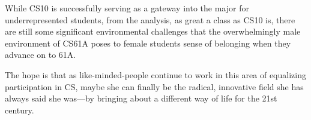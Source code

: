 \documentclass[twoside,openright,titlepage,numbers=noenddot,headinclude,%
               footinclude=true,cleardoublepage=empty,abstractoff,BCOR=5mm,%
               paper=a4,fontsize=11pt,ngerman,american]{scrreprt}
\numberwithin{theorem}{chapter}
\numberwithin{definition}{chapter}
\numberwithin{algorithm}{chapter}
\numberwithin{figure}{chapter}
\numberwithin{table}{chapter}
\numberwithin{equation}{chapter}
\begin{document}
While CS10 is successfully serving as a gateway into the major for underrepresented students, from the analysis, as great a class as CS10 is, there are still some significant environmental challenges that the overwhelmingly male environment of CS61A poses to female students sense of belonging when they advance on to 61A.

The hope is that as like-minded-people continue to work in this area of equalizing participation in CS, maybe she can finally be the radical, innovative field she has always said she was---by bringing about a different way of life for the 21st century. 

\vspace{4\baselineskip}\vspace{-\parskip} %
\footnotesize %

\end{document}
